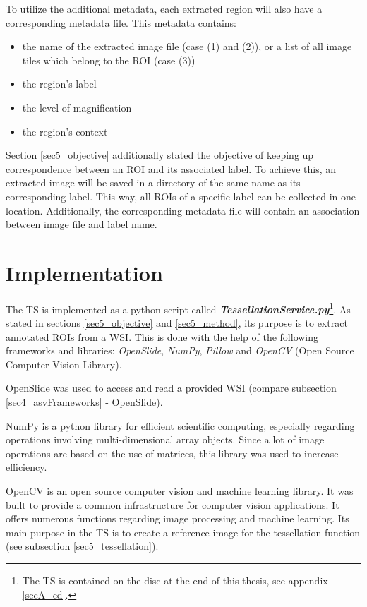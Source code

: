 To utilize the additional metadata, each extracted region will also have a corresponding metadata file. This metadata contains:
\begin{itemize}
	\item the name of the extracted image file (case (1) and (2)), or a list of all image tiles which belong to the ROI (case (3))
	\item the region's label
	\item the level of magnification
	\item the region's context
\end{itemize}

Section \ref{sec5_objective} additionally stated the objective of keeping up correspondence between an ROI and its associated label. To achieve this, an extracted image will be saved in a directory of the same name as its corresponding label. This way, all ROIs of a specific label can be collected in one location. Additionally, the corresponding metadata file will contain an association between image file and label name.


\section{Implementation}
\label{sec5_impl}
The TS is implemented as a python script called \textbf{\emph{TessellationService.py}}\footnote{
	The TS is contained on the disc at the end of this thesis, see appendix \ref{secA_cd}.
}. As stated in sections \ref{sec5_objective} and \ref{sec5_method}, its purpose is to extract annotated ROIs from a WSI. This is done with the help of the following frameworks and libraries: \emph{OpenSlide}, \emph{NumPy}, \emph{Pillow} and \emph{OpenCV} (Open Source Computer Vision Library).

OpenSlide was used to access and read a provided WSI (compare subsection \ref{sec4_asvFrameworks} - OpenSlide).

NumPy is a python library for efficient scientific computing, especially regarding operations involving multi-dimensional array objects\cite{Walt11}. Since a lot of image operations are based on the use of matrices, this library was used to increase efficiency.

OpenCV is an open source computer vision and machine learning library. It was built to provide a common infrastructure for computer vision applications. It offers numerous functions regarding image processing and machine learning\cite{Bradski08}. Its main purpose in the TS is to create a reference image for the tessellation function (see subsection \ref{sec5_tessellation}).

